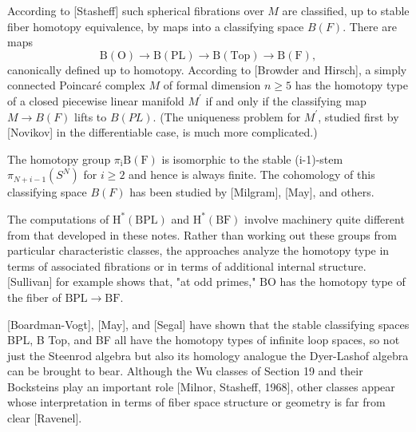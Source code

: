 \documentclass[10pt]{article}
\begin{document}
According to [Stasheff] such spherical fibrations over $M$ are classified, up to stable fiber homotopy equivalence, by maps into a classifying space $B(F)$. There are maps
$$
\mathrm{B}(\mathrm{O}) \rightarrow \mathrm{B}(\mathrm{PL}) \rightarrow \mathrm{B}(\mathrm{Top}) \rightarrow \mathrm{B}(\mathrm{F}),
$$
canonically defined up to homotopy. According to [Browder and Hirsch], a simply connected Poincaré complex $M$ of formal dimension $n \geq 5$ has the homotopy type of a closed piecewise linear manifold $M^{\prime}$ if and only if the classifying map $M \rightarrow B(F)$ lifts to $B(P L)$. (The uniqueness problem for $M^{\prime}$, studied first by [Novikov] in the differentiable case, is much more complicated.)

The homotopy group $\pi_{\mathrm{i}} \mathrm{B}(\mathrm{F})$ is isomorphic to the stable (i-1)-stem $\pi_{N+i-1}\left(S^{N}\right)$ for $i \geq 2$ and hence is always finite. The cohomology of this classifying space $B(F)$ has been studied by [Milgram], [May], and others.

The computations of $\mathrm{H}^{*}(\mathrm{BPL})$ and $\mathrm{H}^{*}(\mathrm{BF})$ involve machinery quite different from that developed in these notes. Rather than working out these groups from particular characteristic classes, the approaches analyze the homotopy type in terms of associated fibrations or in terms of additional internal structure. [Sullivan] for example shows that, "at odd primes," $\mathrm{BO}$ has the homotopy type of the fiber of $\mathrm{BPL} \rightarrow \mathrm{BF}$.

[Boardman-Vogt], [May], and [Segal] have shown that the stable classifying spaces BPL, B Top, and BF all have the homotopy types of infinite loop spaces, so not just the Steenrod algebra but also its homology analogue the Dyer-Lashof algebra can be brought to bear. Although the Wu classes of Section 19 and their Bocksteins play an important role [Milnor, Stasheff, 1968], other classes appear whose interpretation in terms of fiber space structure or geometry is far from clear [Ravenel].
\end{document}
